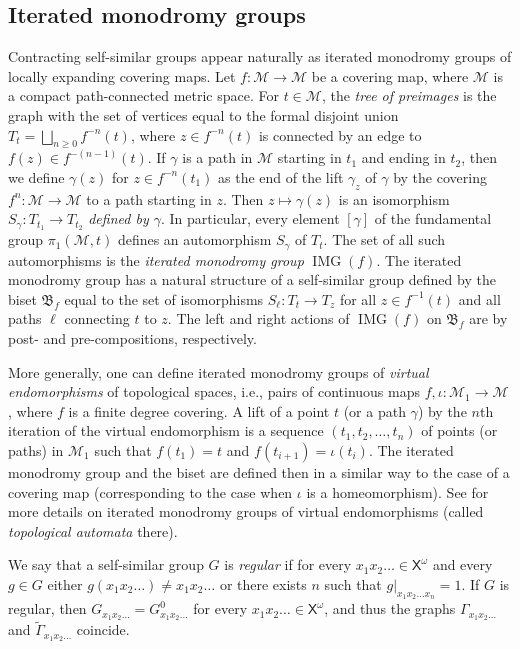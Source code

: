 \documentclass[11pt]{amsart}
\newcommand{\bim}{\mathfrak{B}}
\newcommand{\arr}{\longrightarrow}
\newcommand{\xo}{\alb^\omega}
\newcommand{\M}{\ensuremath{\mathcal{M}}}%
\newcommand{\alb}{\ensuremath{\mathsf{X}}}%
\newcommand{\Gammatilde}{\ensuremath{\widetilde{\Gamma}}}%
\theoremstyle{definition}
\theoremstyle{plain}
\newtheorem{main thm}{Theorem}
\theoremstyle{remark}
\theoremstyle{plain}
\begin{document}
\subsection{Iterated monodromy groups}
\label{s-IMG}
Contracting self-similar groups appear naturally as iterated monodromy groups of locally expanding covering maps. Let $f\colon\M\arr\M$ be a covering map, where $\M$ is a compact path-connected metric space.  For $t\in\M$, the \emph{tree of preimages} is the graph with the set of vertices equal to the formal disjoint union $T_t=\bigsqcup_{n\ge 0}f^{-n}(t)$, where $z\in f^{-n}(t)$ is connected by an edge to $f(z)\in f^{-(n-1)}(t)$. If $\gamma$ is a path in $\M$ starting in $t_1$ and ending in $t_2$, then we define $\gamma(z)$ for $z\in f^{-n}(t_1)$ as the end of the lift $\gamma_z$ of $\gamma$ by the covering $f^n\colon\M\arr\M$ to a path starting in $z$. Then $z\mapsto\gamma(z)$ is an isomorphism $S_\gamma\colon T_{t_1}\arr T_{t_2}$ \emph{defined by $\gamma$}. In particular, every element $[\gamma]$ of the fundamental group $\pi_1(\M, t)$ defines an automorphism $S_\gamma$ of $T_t$. The set of all such automorphisms is the \emph{iterated monodromy group} $\mathop{\mathrm{IMG}}(f)$. The iterated monodromy group has a natural structure of a self-similar group defined by the biset $\bim_f$ equal to the set of isomorphisms $S_\ell\colon T_t\arr T_z$ for all $z\in f^{-1}(t)$ and all paths $\ell$ connecting $t$ to $z$. The left and right actions of $\mathop{\mathrm{IMG}}(f)$ on $\bim_f$ are by post- and pre-compositions, respectively.

More generally, one can define iterated monodromy groups of \emph{virtual endomorphisms} of topological spaces, i.e., pairs of continuous maps $f, \iota\colon\M_1\arr\M$, where $f$ is a finite degree covering. A lift of a point $t$ (or a path $\gamma$) by the $n$th iteration of the virtual endomorphism is a sequence $(t_1, t_2, \ldots, t_n)$ of points (or paths) in $\M_1$ such that $f(t_1)=t$ and $f(t_{i+1})=\iota(t_i)$. The iterated monodromy group and the biset are defined then in a similar way to the case of a covering map (corresponding to the case when $\iota$ is a homeomorphism). See \cite{Nek:combinatorialmodels} for more details on iterated monodromy groups of virtual endomorphisms (called \emph{topological automata} there).

We say that a self-similar group $G$ is \emph{regular} if for every $x_1x_2\ldots\in\xo$ and every $g\in G$ either $g(x_1x_2\ldots)\ne x_1x_2\ldots$ or there exists $n$ such that $g|_{x_1x_2\ldots x_n}=1$. If $G$ is regular, then $G_{x_1x_2\ldots}=G_{x_1x_2\ldots}^0$ for every $x_1x_2\ldots\in\xo$, and thus the graphs $\Gamma_{x_1x_2\ldots}$ and $\Gammatilde_{x_1x_2\ldots}$ coincide.
\end{document}
